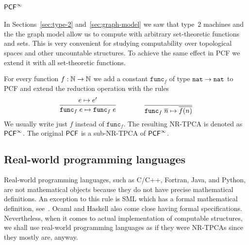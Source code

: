 \subsubsection{$\mathsf{PCF}^\infty$}

In Sections~\ref{sec:type-2} and~\ref{sec:graph-model} we saw that
type~2 machines and the the graph model allow us to compute with
arbitrary set-theoretic functions and sets. This is very convenient
for studying computability over topological spaces and other
uncountable structures. To achieve the same effect in PCF we extend it
with all set-theoretic functions.

For every function $f : \mathbb{N} \to \mathbb{N}$ we add a constant
$\mathtt{func}_f$ of type $\mathtt{nat} \to \mathtt{nat}$ to PCF and extend the
reduction operation with the rules
%
\begin{equation*}
  \begin{gathered}\dfrac{e \mapsto e'}{\mathtt{func}_f\;e \mapsto \mathtt{func}_f\;e}\end{gathered}
  \qquad\qquad
  \dfrac{}{\mathtt{func}_f\;\overline{n} \mapsto \overline{f(n)}}
\end{equation*}
%
We usually write just $f$ instead of $\mathtt{func}_f$. The resulting
NR-TPCA is denoted as $\mathsf{PCF}^\infty$. The original $\mathsf{PCF}$ is a sub-NR-TPCA
of $\mathsf{PCF}^\infty$.


\subsection{Real-world programming languages}
\label{sec:programming-languages}

Real-world programming languages, such as C/C++, Fortran, Java, and
Python, are not mathematical objects because they do not have precise
mathematical definitions. An exception to this rule is SML which has a
formal mathematical definition, see~\cite{MilnerR:defsml}. Ocaml and
Haskell also come close having formal specifications. Nevertheless,
when it comes to actual implementation of computable structures, we
shall use real-world programming languages as if they were NR-TPCAs
since they mostly are, anyway.



